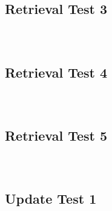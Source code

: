 \documentclass[14pt,a4paper]{article}
\begin{document}
    \inputminted[bgcolor=LightGray,breaklines,breakafter=d]{cpp}{ret_test_2_og.cpp}
    
    \inputminted[bgcolor=LightGray,breaklines,breakafter=d]{cpp}{ret_test_2_js.cpp}
    
    \subsection{Retrieval Test 3}
    
    \inputminted[bgcolor=LightGray,breaklines,breakafter=d]{cpp}{ret_test_3_pg.cpp}
    
    \inputminted[bgcolor=LightGray,breaklines,breakafter=d]{cpp}{ret_test_3_og.cpp}
    
    \inputminted[bgcolor=LightGray,breaklines,breakafter=d]{cpp}{ret_test_3_js.cpp}
    
    \subsection{Retrieval Test 4}
    
    \inputminted[bgcolor=LightGray,breaklines,breakafter=d]{cpp}{ret_test_4_pg.cpp}
    
    \inputminted[bgcolor=LightGray,breaklines,breakafter=d]{cpp}{ret_test_4_og.cpp}
    
    \inputminted[bgcolor=LightGray,breaklines,breakafter=d]{cpp}{ret_test_4_js.cpp}
    
    \subsection{Retrieval Test 5}
    
    \inputminted[bgcolor=LightGray,breaklines,breakafter=d]{cpp}{ret_test_5_pg.cpp}
    
    \inputminted[bgcolor=LightGray,breaklines,breakafter=d]{cpp}{ret_test_5_og.cpp}
    
    \inputminted[bgcolor=LightGray,breaklines,breakafter=d]{cpp}{ret_test_5_js.cpp}
    
    \subsection{Update Test 1}
    
    \inputminted[bgcolor=LightGray,breaklines,breakafter=d]{cpp}{upd_test_1_pg.cpp}
    
    \inputminted[bgcolor=LightGray,breaklines,breakafter=d]{cpp}{upd_test_1_og.cpp}
    
\end{document}

